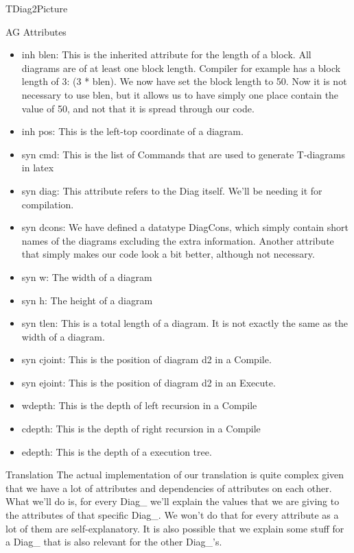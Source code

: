 \documentclass{article}
\begin{document}
\begin{subsection}{TDiag2Picture}
\begin{subsubsection}{AG Attributes}
\begin{itemize}
	\item inh blen: This is the inherited attribute for the length of a block. All diagrams are of at least one block length. Compiler for example has a block length of 3: (3 * blen). We now have set the block length to 50. Now it is not necessary to use blen, but it allows us to have simply one place contain the value of 50, and not that it is spread through our code. 
	\item inh pos: This is the left-top coordinate of a diagram.
	\item syn cmd: This is the list of Commands that are used to generate T-diagrams in latex
	\item syn diag: This attribute refers to the Diag itself. We'll be needing it for compilation.
	\item syn dcons: We have defined a datatype DiagCons, which simply contain short names of the diagrams excluding the extra information. Another attribute that simply makes our code look a bit better, although not necessary.
	\item syn w: The width of a diagram
	\item syn h: The height of a diagram
	\item syn tlen: This is a total length of a diagram. It is not exactly the same as the width of a diagram. 
	\item syn cjoint: This is the position of diagram d2 in a Compile.
	\item syn ejoint: This is the position of diagram d2 in an Execute.
	\item wdepth: This is the depth of left recursion in a Compile
	\item cdepth: This is the depth of right recursion in a Compile
	\item edepth: This is the depth of a execution tree. 
\end{itemize}
\end{subsubsection}
\begin{subsubsection}{Translation}
The actual implementation of our translation is quite complex given that we have a lot of attributes and dependencies of attributes on each other. What we'll do is, for every Diag\_ we'll explain the values that we are giving to the attributes of that specific Diag\_.
We won't do that for every attribute as a lot of them are self-explanatory. It is also possible that we explain some stuff for a Diag\_ that is also relevant for the other Diag\_'s.


\end{subsubsection}
\end{subsection}
\end{document}
